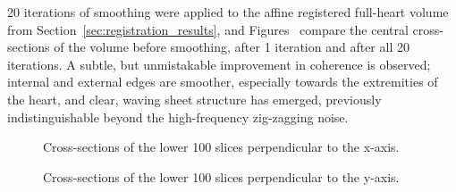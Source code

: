     20 iterations of smoothing were applied to the affine registered full-heart volume from Section~\ref{sec:registration_results}, and Figures~ compare the central cross-sections of the volume before smoothing, after 1 iteration and after all 20 iterations. A subtle, but unmistakable improvement in coherence is observed; internal and external edges are smoother, especially towards the extremities of the heart, and clear, waving sheet structure has emerged, previously indistinguishable beyond the high-frequency zig-zagging noise.
    
    \begin{figure}
      \centering
      \caption{Cross-sections of the lower 100 slices perpendicular to the x-axis.}
      \label{fig:adjusted_bottom_vessels_0_235}
    \end{figure}

    \begin{figure}
      \centering
      \caption{Cross-sections of the lower 100 slices perpendicular to the y-axis.}
      \label{fig:adjusted_bottom_vessels_1_287}
    \end{figure}
    
